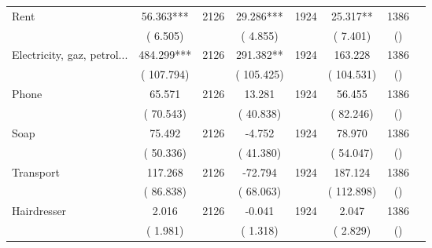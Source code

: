 \begin{tabular}{l*{6}{c}}
Rent        &             56.363***      &       2126       &             29.286***      &       1924       &             25.317**      &       1386  &  &              \\
                       &       (       6.505)            &                               &       (       4.855)            &                               &       (       7.401)            &       () &                  \\
Electricity, gaz, petrol...        &            484.299***      &       2126       &            291.382**      &       1924       &            163.228      &       1386  &  &              \\
                       &       (     107.794)            &                               &       (     105.425)            &                               &       (     104.531)            &       () &                  \\
Phone        &             65.571      &       2126       &             13.281      &       1924       &             56.455      &       1386  &  &              \\
                       &       (      70.543)            &                               &       (      40.838)            &                               &       (      82.246)            &       () &                  \\
Soap        &             75.492      &       2126       &             -4.752      &       1924       &             78.970      &       1386  &  &              \\
                       &       (      50.336)            &                               &       (      41.380)            &                               &       (      54.047)            &       () &                  \\
Transport        &            117.268      &       2126       &            -72.794      &       1924       &            187.124      &       1386  &  &              \\
                       &       (      86.838)            &                               &       (      68.063)            &                               &       (     112.898)            &       () &                  \\
Hairdresser        &              2.016      &       2126       &             -0.041      &       1924       &              2.047      &       1386  &  &              \\
                       &       (       1.981)            &                               &       (       1.318)            &                               &       (       2.829)            &       () &                  \\

\end{tabular}
